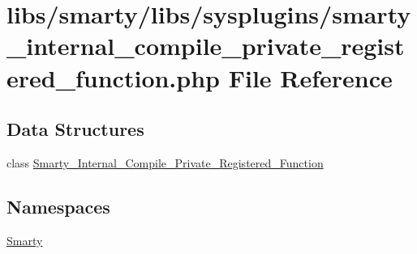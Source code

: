 \hypertarget{smarty__internal__compile__private__registered__function_8php}{}\section{libs/smarty/libs/sysplugins/smarty\+\_\+internal\+\_\+compile\+\_\+private\+\_\+registered\+\_\+function.php File Reference}
\label{smarty__internal__compile__private__registered__function_8php}
\subsection*{Data Structures}
\begin{DoxyCompactItemize}
\item 
class \hyperlink{class_smarty___internal___compile___private___registered___function}{Smarty\+\_\+\+Internal\+\_\+\+Compile\+\_\+\+Private\+\_\+\+Registered\+\_\+\+Function}
\end{DoxyCompactItemize}
\subsection*{Namespaces}
\begin{DoxyCompactItemize}
\item 
 \hyperlink{namespace_smarty}{Smarty}
\end{DoxyCompactItemize}
